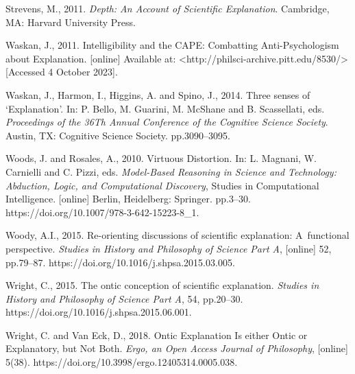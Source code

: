 Strevens, M., 2011. \textit{Depth: An Account of Scientific Explanation}. Cambridge, MA: Harvard University Press.

Waskan, J., 2011. Intelligibility and the CAPE: Combatting Anti-Psychologism about Explanation. [online] Available at: {\textless}http://philsci-archive.pitt.edu/8530/{\textgreater} [Accessed 4 October 2023].

Waskan, J., Harmon, I., Higgins, A. and Spino, J., 2014. Three senses of ‘Explanation'. In: P. Bello, M. Guarini, M. McShane and B. Scassellati, eds. \textit{Proceedings of the 36Th Annual Conference of the Cognitive Science Society}. Austin, TX: Cognitive Science Society. pp.3090–3095.

Woods, J. and Rosales, A., 2010. Virtuous Distortion. In: L. Magnani, W. Carnielli and C. Pizzi, eds. \textit{Model-Based Reasoning in Science and Technology: Abduction, Logic, and Computational Discovery}, Studies in Computational Intelligence. [online] Berlin, Heidelberg: Springer. pp.3–30. https://doi.org/10.1007/978-3-642-15223-8\_1.

Woody, A.I., 2015. Re-orienting discussions of scientific explanation: A~functional perspective. \textit{Studies in History and Philosophy of Science Part A}, [online] 52, pp.79–87. https://doi.org/10.1016/j.shpsa.2015.03.005.

Wright, C., 2015. The ontic conception of scientific explanation. \textit{Studies in History and Philosophy of Science Part A}, 54, pp.20–30. https://doi.org/10.1016/j.shpsa.2015.06.001.

Wright, C. and Van Eck, D., 2018. Ontic Explanation Is either Ontic or Explanatory, but Not Both. \textit{Ergo, an Open Access Journal of Philosophy}, [online] 5(38). https://doi.org/10.3998/ergo.12405314.0005.038.

